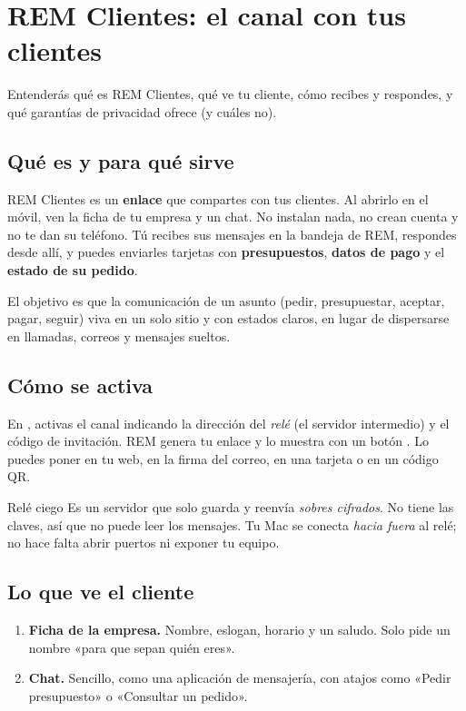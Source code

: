 \chapter{REM Clientes: el canal con tus clientes}\label{cap:remclientes}

\begin{objbox}
Entenderás qué es REM Clientes, qué ve tu cliente, cómo recibes y respondes, y qué garantías de privacidad ofrece (y cuáles no).
\end{objbox}

\section{Qué es y para qué sirve}
REM Clientes es un \textbf{enlace} que compartes con tus clientes. Al abrirlo en el móvil, ven la ficha de tu empresa y un chat. No instalan nada, no crean cuenta y no te dan su teléfono. Tú recibes sus mensajes en la bandeja de REM, respondes desde allí, y puedes enviarles tarjetas con \textbf{presupuestos}, \textbf{datos de pago} y el \textbf{estado de su pedido}.

El objetivo es que la comunicación de un asunto (pedir, presupuestar, aceptar, pagar, seguir) viva en un solo sitio y con estados claros, en lugar de dispersarse en llamadas, correos y mensajes sueltos.

\section{Cómo se activa}
En , activas el canal indicando la dirección del \emph{relé} (el servidor intermedio) y el código de invitación. REM genera tu enlace y lo muestra con un botón . Lo puedes poner en tu web, en la firma del correo, en una tarjeta o en un código QR.

\begin{plainbox}{Relé ciego}
Es un servidor que solo guarda y reenvía \emph{sobres cifrados}. No tiene las claves, así que no puede leer los mensajes. Tu Mac se conecta \emph{hacia fuera} al relé; no hace falta abrir puertos ni exponer tu equipo.
\end{plainbox}

\section{Lo que ve el cliente}
\begin{enumerate}
\item \textbf{Ficha de la empresa.} Nombre, eslogan, horario y un saludo. Solo pide un nombre «para que sepan quién eres».
\item \textbf{Chat.} Sencillo, como una aplicación de mensajería, con atajos como «Pedir presupuesto» o «Consultar un pedido».
\end{enumerate}

